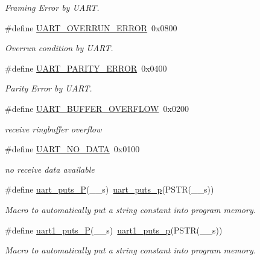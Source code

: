 \begin{DoxyCompactItemize}
\begin{DoxyCompactList}\small\item\em Framing Error by U\+A\+RT. \end{DoxyCompactList}\item 
\#define \hyperlink{a00008_ga3183177e3613d8785d8cc8516931beb6}{U\+A\+R\+T\+\_\+\+O\+V\+E\+R\+R\+U\+N\+\_\+\+E\+R\+R\+OR}~0x0800
\begin{DoxyCompactList}\small\item\em Overrun condition by U\+A\+RT. \end{DoxyCompactList}\item 
\#define \hyperlink{a00008_ga946e3d317937e003d2057bf19e96dd1d}{U\+A\+R\+T\+\_\+\+P\+A\+R\+I\+T\+Y\+\_\+\+E\+R\+R\+OR}~0x0400
\begin{DoxyCompactList}\small\item\em Parity Error by U\+A\+RT. \end{DoxyCompactList}\item 
\#define \hyperlink{a00008_ga94758f3dad6864703b7417d3e40f11df}{U\+A\+R\+T\+\_\+\+B\+U\+F\+F\+E\+R\+\_\+\+O\+V\+E\+R\+F\+L\+OW}~0x0200
\begin{DoxyCompactList}\small\item\em receive ringbuffer overflow \end{DoxyCompactList}\item 
\#define \hyperlink{a00008_ga77ba544d423ff42d400220a05303f268}{U\+A\+R\+T\+\_\+\+N\+O\+\_\+\+D\+A\+TA}~0x0100
\begin{DoxyCompactList}\small\item\em no receive data available \end{DoxyCompactList}\item 
\#define \hyperlink{a00008_gae9e143569df2285379bc55f9f5595bf9}{uart\+\_\+puts\+\_\+P}(\+\_\+\+\_\+s)~\hyperlink{a00008_ga6d78b6744db6232f52b4616402036c2f}{uart\+\_\+puts\+\_\+p}(P\+S\+TR(\+\_\+\+\_\+s))
\begin{DoxyCompactList}\small\item\em Macro to automatically put a string constant into program memory. \end{DoxyCompactList}\item 
\#define \hyperlink{a00008_gaabd7a5b0c15611ee9ecb2873cc9ee87a}{uart1\+\_\+puts\+\_\+P}(\+\_\+\+\_\+s)~\hyperlink{a00008_ga1e8074d0a2d5922601c5db2f9777ba79}{uart1\+\_\+puts\+\_\+p}(P\+S\+TR(\+\_\+\+\_\+s))
\begin{DoxyCompactList}\small\item\em Macro to automatically put a string constant into program memory. \end{DoxyCompactList}\end{DoxyCompactItemize}
